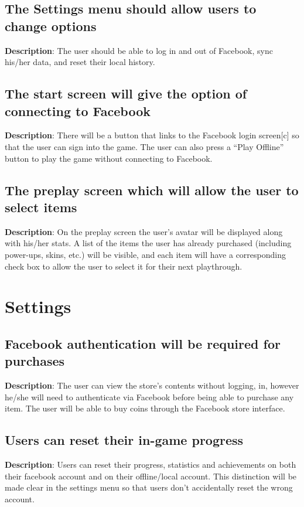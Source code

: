 \subsection{The Settings menu should allow users to change options}
\textbf{Description}: The user should be able to log in and out of
Facebook, sync his/her data, and reset their local history.

\subsection{The start screen will give the option of connecting to Facebook}
\textbf{Description}: There will be a button that links to the Facebook
login screen{[}c{]} so that the user can sign into the game. The user
can also press a \textquotedblleft{}Play Offline\textquotedblright{}
button to play the game without connecting to Facebook.

\subsection{The preplay screen which will allow the user to select items}
\textbf{Description}: On the preplay screen the user\textquoteright{}s
avatar will be displayed along with his/her stats. A list of the items
the user has already purchased (including power-ups, skins, etc.)
will be visible, and each item will have a corresponding check box
to allow the user to select it for their next playthrough.

\section{Settings}
\renewcommand\thesubsection{SET-%
\ifnum\value{subsection}<10 0\fi
\arabic{subsection}}
\subsection{Facebook authentication will be required for purchases}
\textbf{Description}: The user can view the store\textquoteright{}s
contents without logging, in, however he/she will need to authenticate
via Facebook before being able to purchase any item. The user will
be able to buy coins through the Facebook store interface.

\subsection{Users can reset their in-game progress}
\textbf{Description}: Users can reset their progress, statistics and
achievements on both their facebook account and on their offline/local
account. This distinction will be made clear in the settings menu
so that users don\textquoteright{}t accidentally reset the wrong account.

